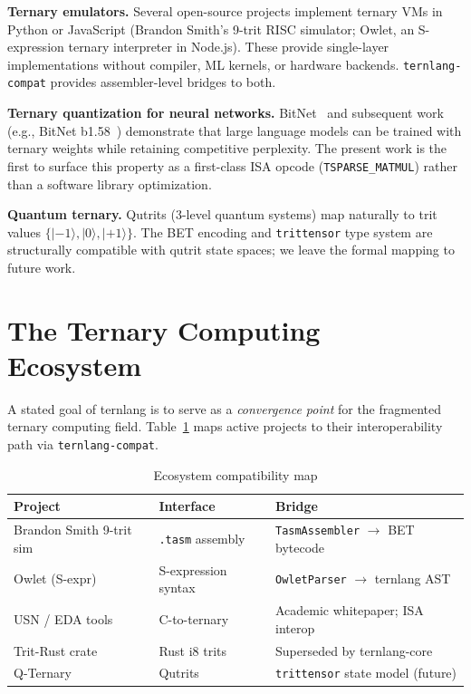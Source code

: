 \documentclass[journal,10pt,twocolumn]{IEEEtran}
\begin{document}
\textbf{Ternary emulators.} Several open-source projects implement ternary
VMs in Python or JavaScript (Brandon Smith's 9-trit RISC simulator; Owlet,
an S-expression ternary interpreter in Node.js). These provide single-layer
implementations without compiler, ML kernels, or hardware backends.
\texttt{ternlang-compat} provides assembler-level bridges to both.

\textbf{Ternary quantization for neural networks.} BitNet~\cite{ma2024era}
and subsequent work (e.g., BitNet b1.58~\cite{ma2024bitnet158}) demonstrate
that large language models can be trained with ternary weights while retaining
competitive perplexity. The present work is the first to surface this property
as a first-class ISA opcode (\texttt{TSPARSE\_MATMUL}) rather than a software
library optimization.

\textbf{Quantum ternary.} Qutrits (3-level quantum systems) map naturally to
trit values $\{|{-1}\rangle, |0\rangle, |{+1}\rangle\}$. The BET encoding and
\texttt{trittensor} type system are structurally compatible with qutrit state
spaces; we leave the formal mapping to future work.

\section{The Ternary Computing Ecosystem}
\label{sec:ecosystem}

A stated goal of ternlang is to serve as a \emph{convergence point} for the
fragmented ternary computing field. Table~\ref{tab:ecosystem} maps active
projects to their interoperability path via \texttt{ternlang-compat}.

\begin{table}[h]
\centering
\small
\caption{Ecosystem compatibility map}
\label{tab:ecosystem}
\begin{tabular}{p{2.2cm}p{2.2cm}p{2.8cm}}
\toprule
Project & Interface & Bridge \\
\midrule
Brandon Smith 9-trit sim & \texttt{.tasm} assembly & \texttt{TasmAssembler} $\to$ BET bytecode \\
Owlet (S-expr) & S-expression syntax & \texttt{OwletParser} $\to$ ternlang AST \\
USN / EDA tools & C-to-ternary & Academic whitepaper; ISA interop \\
Trit-Rust crate & Rust i8 trits & Superseded by ternlang-core \\
Q-Ternary & Qutrits & \texttt{trittensor} state model (future) \\
\bottomrule
\end{tabular}
\end{table}
\end{document}
